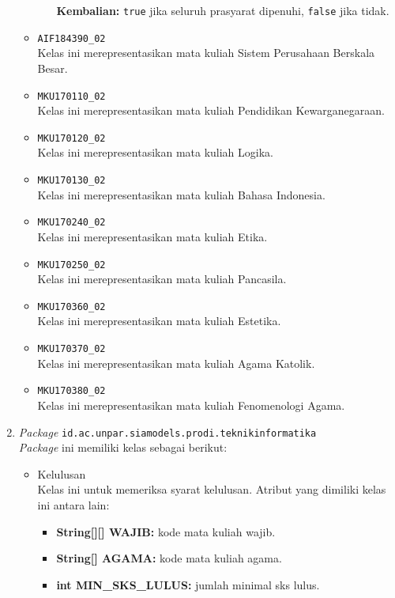 \begin{enumerate}
\begin{itemize}
\begin{itemize}
			\textbf{Kembalian:} \texttt{true} jika seluruh prasyarat dipenuhi, \texttt{false} jika tidak.
		\end{itemize}
		\item \texttt{AIF184390\_02} \\
		Kelas ini merepresentasikan mata kuliah Sistem Perusahaan Berskala Besar.
		\item \texttt{MKU170110\_02} \\
		Kelas ini merepresentasikan mata kuliah Pendidikan Kewarganegaraan.
		\item \texttt{MKU170120\_02} \\
		Kelas ini merepresentasikan mata kuliah Logika.
		\item \texttt{MKU170130\_02} \\
		Kelas ini merepresentasikan mata kuliah Bahasa Indonesia.
		\item \texttt{MKU170240\_02} \\
		Kelas ini merepresentasikan mata kuliah Etika.
		\item \texttt{MKU170250\_02} \\
		Kelas ini merepresentasikan mata kuliah Pancasila.
		\item \texttt{MKU170360\_02} \\
		Kelas ini merepresentasikan mata kuliah Estetika.
		\item \texttt{MKU170370\_02} \\
		Kelas ini merepresentasikan mata kuliah Agama Katolik.
		\item \texttt{MKU170380\_02} \\
		Kelas ini merepresentasikan mata kuliah Fenomenologi Agama.
	\end{itemize}
	\item \textit{Package} \texttt{id.ac.unpar.siamodels.prodi.teknikinformatika}\\
	\textit{Package} ini memiliki kelas sebagai berikut:
	\begin{itemize}
		\item Kelulusan\\
		Kelas ini untuk memeriksa syarat kelulusan. Atribut yang dimiliki kelas ini antara lain:
		\begin{itemize}
			\item \textbf{String[][] WAJIB:} kode mata kuliah wajib.
			\item \textbf{String[] AGAMA:} kode mata kuliah agama.
			\item \textbf{int MIN\_SKS\_LULUS:} jumlah minimal sks lulus.
		\end{itemize}

\end{itemize}
\end{enumerate}
